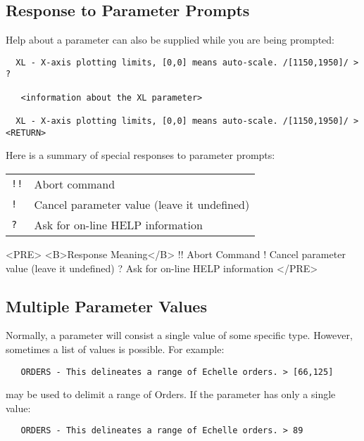 \subsection{Response to Parameter Prompts}

Help about a parameter can also be supplied while you are being
prompted:

\begin{verbatim}
  XL - X-axis plotting limits, [0,0] means auto-scale. /[1150,1950]/ > ?

   <information about the XL parameter>

  XL - X-axis plotting limits, [0,0] means auto-scale. /[1150,1950]/ > <RETURN>
\end{verbatim}

Here is a summary of special responses to parameter prompts:

\begin{latexonly}
\begin{tabular}{ll}
{\tt !!}  & Abort command\\
{\tt !}   & Cancel parameter value (leave it undefined)\\
{\tt ?}   & Ask for on-line HELP information\\
\end{tabular}
\end{latexonly}

\begin{htmlonly}
\begin{rawhtml}
<PRE>
<B>Response  Meaning</B>
   !!     Abort Command
   !      Cancel parameter value (leave it undefined)
   ?      Ask for on-line HELP information
</PRE>
\end{rawhtml}
\end{htmlonly}

\subsection{Multiple Parameter Values}

Normally, a parameter will consist a single value of some specific type.
However, sometimes a list of values is possible.  For example:

\begin{verbatim}
   ORDERS - This delineates a range of Echelle orders. > [66,125]
\end{verbatim}

may be used to delimit a range of Orders.  If the parameter has only a single
value:

\begin{verbatim}
   ORDERS - This delineates a range of Echelle orders. > 89
\end{verbatim}

